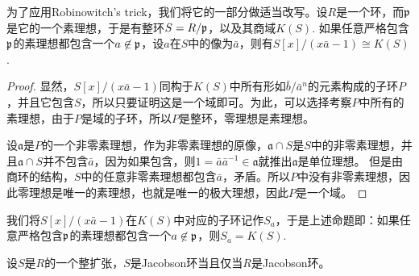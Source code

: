 为了应用Robinowitch's trick，我们将它的一部分做适当改写。设$R$是一个环，而$\mathfrak{p}$是它的一个素理想，于是有整环$S=R/\mathfrak{p}$，以及其商域$K(S)$. 如果任意严格包含$\mathfrak{p}$的素理想都包含一个$a\not\in \mathfrak{p}$，设$a$在$S$中的像为$\bar{a}$，则有$S[x]/(x\bar{a}-1)\cong K(S)$.

\begin{proof} 显然，$S[x]/(x\bar{a}-1)$同构于$K(S)$中所有形如$\bar{b}/\bar{a}^n$的元素构成的子环$P$，并且它包含$S$，所以只要证明这是一个域即可。为此，可以选择考察$P$中所有的素理想，由于$P$是域的子环，所以$P$是整环，零理想是素理想。

设$\mathfrak{a}$是$P$的一个非零素理想，作为非零素理想的原像，$\mathfrak{a}\cap S$是$S$中的非零素理想，并且$\mathfrak{a}\cap S$并不包含$\bar{a}$，因为如果包含，则$1=\bar{a}\bar{a}^{-1}\in \mathfrak{a}$就推出$\mathfrak{a}$是单位理想。 但是由商环的结构，$S$中的任意非零素理想都包含$\bar{a}$，矛盾。所以$P$中没有非零素理想，因此零理想是唯一的素理想，也就是唯一的极大理想，因此$P$是一个域。\end{proof}

我们将$S[x]/(x\bar{a}-1)$在$K(S)$中对应的子环记作$S_a$，于是上述命题即：如果任意严格包含$\mathfrak{p}$的素理想都包含一个$a\not\in \mathfrak{p}$，则$S_a=K(S)$. 

\begin{pro}
设$S$是$R$的一个整扩张，$S$是Jacobson环当且仅当$R$是Jacobson环。
\end{pro}

